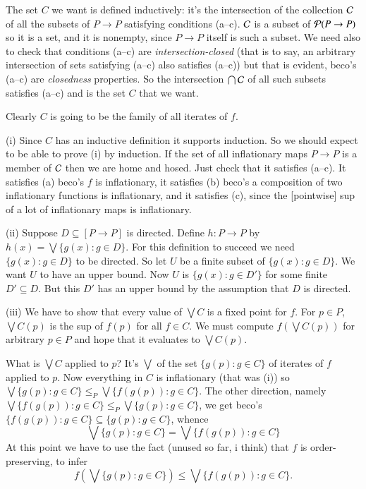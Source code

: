 \documentclass{book}
\begin{document}
\smallskip

The set $C$ we want is defined inductively: it's the intersection of
the collection ${\cal C}$ of all the subsets of $P \to P$ satisfying
conditions (a--c). ${\cal C}$ is a subset of ${\cal P}(P \to P)$ so it
is a set, and it is nonempty, since $P \to P$ itself is such a subset. 
We need also to check that conditions (a--c) are {\sl intersection-closed} 
(that is to say, an arbitrary intersection of sets satisfying (a--c) also 
satisfies (a--c)) but that is evident, beco's (a--c) are {\sl closedness} 
properties.  So the intersection $\bigcap{\cal C}$ of all such subsets 
satisfies (a--c) and is the set $C$ that we want.

Clearly $C$ is going to be the family of all iterates of $f$.  

\bigskip

(i) Since $C$ has an inductive definition it supports induction.  So
we should expect to be able to prove (i) by induction.  If the set of
all inflationary maps $P \to P$ is a member of ${\cal C}$ then we are
home and hosed.  Just check that it satisfies (a--c).  It satisfies
(a) beco's $f$ is inflationary, it satisfies (b) beco's a composition
of two inflationary functions is inflationary, and it satisfies (c),
since the [pointwise] sup of a lot of inflationary maps is
inflationary.

  \medskip

(ii) Suppose $D \subseteq [P \to P]$ is directed.  Define $h: P \to P$
by $h(x) =\bigvee\{g(x): g \in D\}$.  For this definition to succeed we need
$\{g(x): g \in D\}$ to be directed.  So let $U$ be a finite subset of
$\{g(x): g \in D\}$.  We want $U$ to have an upper bound.  Now $U$ is
$\{g(x): g \in D'\}$ for some finite $D' \subseteq D$.  But this $D'$
has an upper bound by the assumption that $D$ is directed.

\medskip

(iii) We have to show that every value of $\bigvee C$ is a fixed point
for $f$.  For $p \in P$, $\bigvee C(p)$ is the sup of $f(p)$ for all
$f \in C$.  We must compute $f(\bigvee C(p))$ for arbitrary $p \in P$
and hope that it evaluates to $\bigvee C(p)$.


What is $\bigvee C$ applied to $p$?  It's $\bigvee$ of the set $\{g(p):
g\in C\}$ of iterates of $f$ applied to $p$.  Now everything in $C$ is
inflationary (that was (i)) so $\bigvee\{g(p): g\in C\} \leq_P \bigvee\{f(g(p)):
g\in C\}$.  The other direction, namely $\bigvee\{f(g(p)): g\in C\} \leq_P
\bigvee\{g(p): g\in C\}$,  we get beco's $\{f(g(p)): g\in C\} \subseteq
\{g(p): g\in C\}$, whence
\begin{equation}\tag{A}
\bigvee\{g(p): g\in C\} =  \bigvee\{f(g(p)): g\in C\}\end{equation}
At this point we have to use the fact (unused so far, i think) that $f$ is order-preserving, to infer
$$f(\bigvee\{g(p): g\in C\}) \leq  \bigvee\{f(g(p)): g\in C\}.$$
\end{document}
